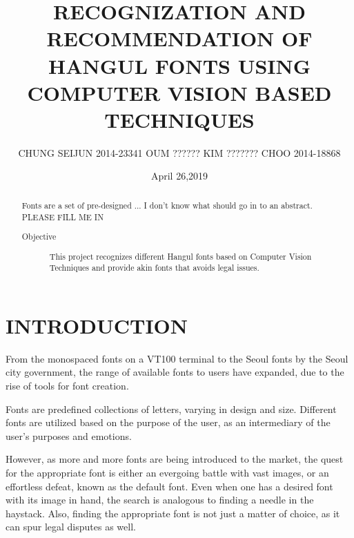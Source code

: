 \documentclass[%
 reprint,
nofootinbib,
nobibnotes,
amsmath,amssymb,
aps,
]{revtex4-1}
\begin{document}

\title{RECOGNIZATION AND RECOMMENDATION OF HANGUL FONTS USING COMPUTER VISION BASED
TECHNIQUES}%

\author{CHUNG SEIJUN 2014-23341 OUM ?????? KIM  ??????? CHOO 2014-18868   }
%
\date{April 26,2019}

\begin{abstract}
  Fonts are a set of pre-designed ... I don't know what should go in to an
  abstract. PLEASE FILL ME IN
\begin{description}
\item[Objective]
This project recognizes different Hangul fonts based on Computer Vision
    Techniques and provide akin fonts that avoids legal issues.
\end{description}
\end{abstract}

\maketitle


\section{\label{sec:level1}INTRODUCTION}
From the monospaced fonts on a VT100 terminal to the
Seoul fonts by the Seoul city government, the range of available fonts to users have expanded, due to the rise of tools for font creation.

Fonts are predefined collections of letters, varying in design and size.
Different fonts are utilized based on the purpose of the user, as an
intermediary of the user's purposes and emotions.

However, as more and more fonts are being introduced to the market, the quest
for the appropriate font is either an evergoing battle with vast images,
or an effortless defeat, known as the default font. Even when one has a
desired font with its image in hand, the search is analogous to finding a needle in the
haystack. Also, finding the appropriate font is not just a matter of choice, as it can spur legal
disputes as well.\cite{lawsuit}
\end{document}
